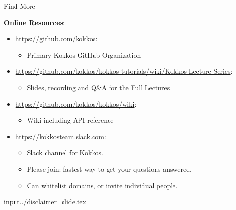 \begin{frame}{Find More}

\textbf{Online Resources}:

\begin{itemize}
        \item \url{https://github.com/kokkos}:
                \begin{itemize}
                        \item Primary Kokkos GitHub Organization
                \end{itemize}
        \item \url{https://github.com/kokkos/kokkos-tutorials/wiki/Kokkos-Lecture-Series}:
                \begin{itemize}
			\item{Slides, recording and Q\&A for the Full Lectures}
                \end{itemize}
        \item \url{https://github.com/kokkos/kokkos/wiki}:
                \begin{itemize}
                        \item Wiki including API reference
                \end{itemize}
        \item \url{https://kokkosteam.slack.com}:
                \begin{itemize}
                        \item Slack channel for Kokkos.
                        \item Please join: fastest way to get your questions answered.
                        \item Can whitelist domains, or invite individual people.
                \end{itemize}
\end{itemize}

\end{frame}

input{../disclaimer_slide.tex}


